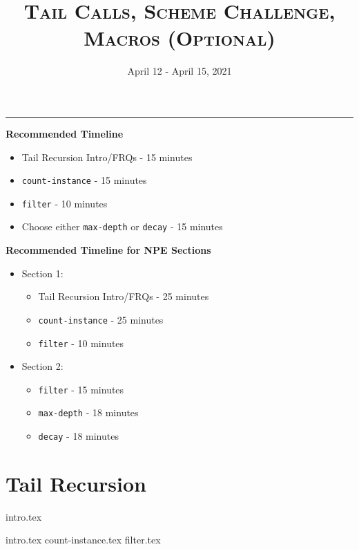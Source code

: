 \documentclass{exam}
\title{\textsc{Tail Calls, Scheme Challenge, Macros (Optional)}}
\date{April 12 - April 15, 2021}
\begin{document}
\maketitle
\rule{\textwidth}{0.15em}
\fontsize{12}{15}\selectfont

\begin{guide}
\begin{blocksection}
    \textbf{Recommended Timeline}
    \begin{itemize}
        \item Tail Recursion Intro/FRQs - 15 minutes
        \item \lstinline{count-instance} - 15 minutes
        \item \lstinline{filter} - 10 minutes
        \item Choose either \lstinline{max-depth} or \lstinline{decay} - 15 minutes
    \end{itemize}
    \vspace{.5cm}
    \textbf{Recommended Timeline for NPE Sections}
    \begin{itemize}
        \item Section 1:
            \begin{itemize}
                \item Tail Recursion Intro/FRQs - 25 minutes
                \item \lstinline{count-instance} - 25 minutes
                \item \lstinline{filter} - 10 minutes
            \end{itemize}
        \item Section 2:
            \begin{itemize}
                \item \lstinline{filter} - 15 minutes
                \item \lstinline{max-depth} - 18 minutes
                \item \lstinline{decay} - 18 minutes
            \end{itemize}
    \end{itemize}
\end{blocksection}
\newpage
\end{guide}

\section{Tail Recursion}
{intro.tex}
\begin{questions}
{intro.tex}
{count-instance.tex}
{filter.tex}
\end{questions}
\end{document}
